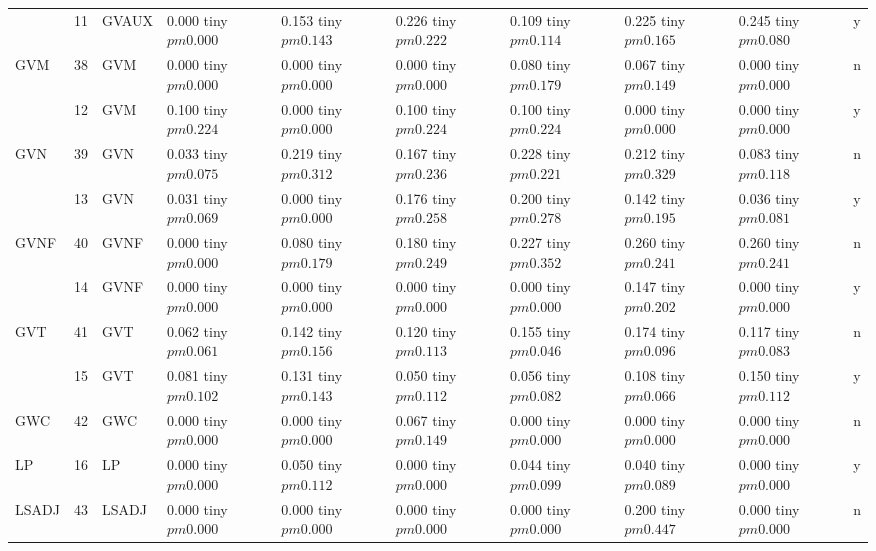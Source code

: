 \begin{table}
\begin{tabular}{llllllllll}
 & 11 & GVAUX & 0.000 tiny $ pm 0.000$ & 0.153 tiny $ pm 0.143$ & 0.226 tiny $ pm 0.222$ & 0.109 tiny $ pm 0.114$ & 0.225 tiny $ pm 0.165$ & 0.245 tiny $ pm 0.080$ & y \\
\cline{1-10}
\multirow[t]{2}{*}{GVM} & 38 & GVM & 0.000 tiny $ pm 0.000$ & 0.000 tiny $ pm 0.000$ & 0.000 tiny $ pm 0.000$ & 0.080 tiny $ pm 0.179$ & 0.067 tiny $ pm 0.149$ & 0.000 tiny $ pm 0.000$ & n \\
 & 12 & GVM & 0.100 tiny $ pm 0.224$ & 0.000 tiny $ pm 0.000$ & 0.100 tiny $ pm 0.224$ & 0.100 tiny $ pm 0.224$ & 0.000 tiny $ pm 0.000$ & 0.000 tiny $ pm 0.000$ & y \\
\cline{1-10}
\multirow[t]{2}{*}{GVN} & 39 & GVN & 0.033 tiny $ pm 0.075$ & 0.219 tiny $ pm 0.312$ & 0.167 tiny $ pm 0.236$ & 0.228 tiny $ pm 0.221$ & 0.212 tiny $ pm 0.329$ & 0.083 tiny $ pm 0.118$ & n \\
 & 13 & GVN & 0.031 tiny $ pm 0.069$ & 0.000 tiny $ pm 0.000$ & 0.176 tiny $ pm 0.258$ & 0.200 tiny $ pm 0.278$ & 0.142 tiny $ pm 0.195$ & 0.036 tiny $ pm 0.081$ & y \\
\cline{1-10}
\multirow[t]{2}{*}{GVNF} & 40 & GVNF & 0.000 tiny $ pm 0.000$ & 0.080 tiny $ pm 0.179$ & 0.180 tiny $ pm 0.249$ & 0.227 tiny $ pm 0.352$ & 0.260 tiny $ pm 0.241$ & 0.260 tiny $ pm 0.241$ & n \\
 & 14 & GVNF & 0.000 tiny $ pm 0.000$ & 0.000 tiny $ pm 0.000$ & 0.000 tiny $ pm 0.000$ & 0.000 tiny $ pm 0.000$ & 0.147 tiny $ pm 0.202$ & 0.000 tiny $ pm 0.000$ & y \\
\cline{1-10}
\multirow[t]{2}{*}{GVT} & 41 & GVT & 0.062 tiny $ pm 0.061$ & 0.142 tiny $ pm 0.156$ & 0.120 tiny $ pm 0.113$ & 0.155 tiny $ pm 0.046$ & 0.174 tiny $ pm 0.096$ & 0.117 tiny $ pm 0.083$ & n \\
 & 15 & GVT & 0.081 tiny $ pm 0.102$ & 0.131 tiny $ pm 0.143$ & 0.050 tiny $ pm 0.112$ & 0.056 tiny $ pm 0.082$ & 0.108 tiny $ pm 0.066$ & 0.150 tiny $ pm 0.112$ & y \\
\cline{1-10}
GWC & 42 & GWC & 0.000 tiny $ pm 0.000$ & 0.000 tiny $ pm 0.000$ & 0.067 tiny $ pm 0.149$ & 0.000 tiny $ pm 0.000$ & 0.000 tiny $ pm 0.000$ & 0.000 tiny $ pm 0.000$ & n \\
\cline{1-10}
LP & 16 & LP & 0.000 tiny $ pm 0.000$ & 0.050 tiny $ pm 0.112$ & 0.000 tiny $ pm 0.000$ & 0.044 tiny $ pm 0.099$ & 0.040 tiny $ pm 0.089$ & 0.000 tiny $ pm 0.000$ & y \\
\cline{1-10}
\multirow[t]{2}{*}{LSADJ} & 43 & LSADJ & 0.000 tiny $ pm 0.000$ & 0.000 tiny $ pm 0.000$ & 0.000 tiny $ pm 0.000$ & 0.000 tiny $ pm 0.000$ & 0.200 tiny $ pm 0.447$ & 0.000 tiny $ pm 0.000$ & n \\

\end{tabular}
\end{table}

